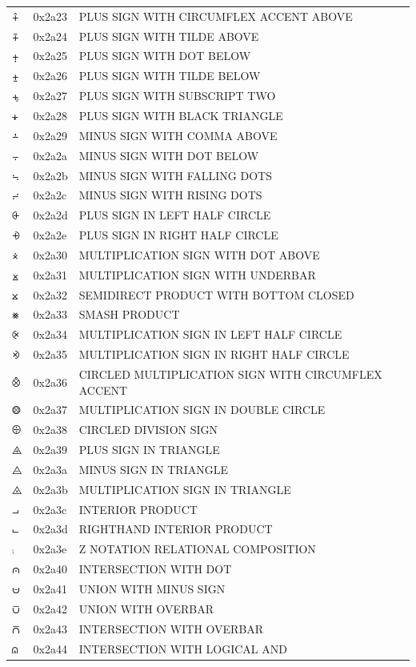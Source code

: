 \documentclass[12pt, twoside]{article}
\begin{document}
\begin{longtable}{L{1.0cm} L{2.0cm} >{\footnotesize}L{10cm}}
$⨣$&0x2a23&PLUS SIGN WITH CIRCUMFLEX ACCENT ABOVE\\
$⨤$&0x2a24&PLUS SIGN WITH TILDE ABOVE\\
$⨥$&0x2a25&PLUS SIGN WITH DOT BELOW\\
$⨦$&0x2a26&PLUS SIGN WITH TILDE BELOW\\
$⨧$&0x2a27&PLUS SIGN WITH SUBSCRIPT TWO\\
$⨨$&0x2a28&PLUS SIGN WITH BLACK TRIANGLE\\
$⨩$&0x2a29&MINUS SIGN WITH COMMA ABOVE\\
$⨪$&0x2a2a&MINUS SIGN WITH DOT BELOW\\
$⨫$&0x2a2b&MINUS SIGN WITH FALLING DOTS\\
$⨬$&0x2a2c&MINUS SIGN WITH RISING DOTS\\
$⨭$&0x2a2d&PLUS SIGN IN LEFT HALF CIRCLE\\
$⨮$&0x2a2e&PLUS SIGN IN RIGHT HALF CIRCLE\\
$⨰$&0x2a30&MULTIPLICATION SIGN WITH DOT ABOVE\\
$⨱$&0x2a31&MULTIPLICATION SIGN WITH UNDERBAR\\
$⨲$&0x2a32&SEMIDIRECT PRODUCT WITH BOTTOM CLOSED\\
$⨳$&0x2a33&SMASH PRODUCT\\
$⨴$&0x2a34&MULTIPLICATION SIGN IN LEFT HALF CIRCLE\\
$⨵$&0x2a35&MULTIPLICATION SIGN IN RIGHT HALF CIRCLE\\
$⨶$&0x2a36&CIRCLED MULTIPLICATION SIGN WITH CIRCUMFLEX ACCENT\\
$⨷$&0x2a37&MULTIPLICATION SIGN IN DOUBLE CIRCLE\\
$⨸$&0x2a38&CIRCLED DIVISION SIGN\\
$⨹$&0x2a39&PLUS SIGN IN TRIANGLE\\
$⨺$&0x2a3a&MINUS SIGN IN TRIANGLE\\
$⨻$&0x2a3b&MULTIPLICATION SIGN IN TRIANGLE\\
$⨼$&0x2a3c&INTERIOR PRODUCT\\
$⨽$&0x2a3d&RIGHTHAND INTERIOR PRODUCT\\
$⨾$&0x2a3e&Z NOTATION RELATIONAL COMPOSITION\\
$⩀$&0x2a40&INTERSECTION WITH DOT\\
$⩁$&0x2a41&UNION WITH MINUS SIGN\\
$⩂$&0x2a42&UNION WITH OVERBAR\\
$⩃$&0x2a43&INTERSECTION WITH OVERBAR\\
$⩄$&0x2a44&INTERSECTION WITH LOGICAL AND\\

\end{longtable}
\end{document}
